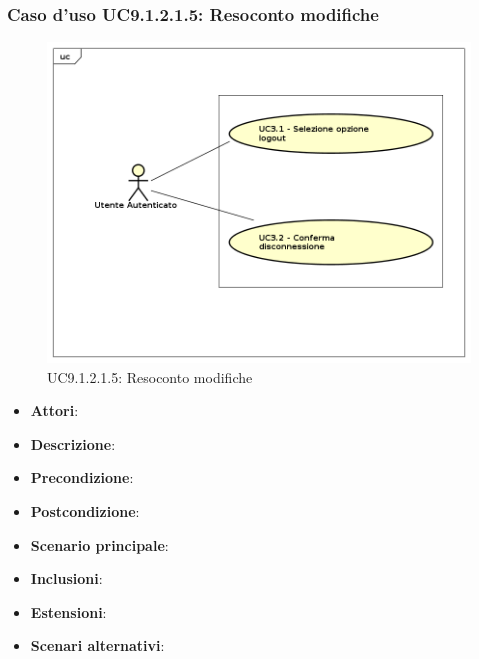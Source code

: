 					\subsubsection{Caso d'uso UC9.1.2.1.5: Resoconto modifiche}
					\label{UC9.1.2.1.5}
					\begin{figure}[h]
						\centering
					\includegraphics[scale=0.7,keepaspectratio]{UML/UC9.png}
						\caption{UC9.1.2.1.5: Resoconto modifiche}
					\end{figure}
					\FloatBarrier
					\begin{itemize}
						\item \textbf{Attori}: 
						\item \textbf{Descrizione}: 
						\item \textbf{Precondizione}: 
						\item \textbf{Postcondizione}: 
						\item \textbf{Scenario principale}:
						\item \textbf{Inclusioni}:
						\item \textbf{Estensioni}:
						\item \textbf{Scenari alternativi}:
					\end{itemize}
					
